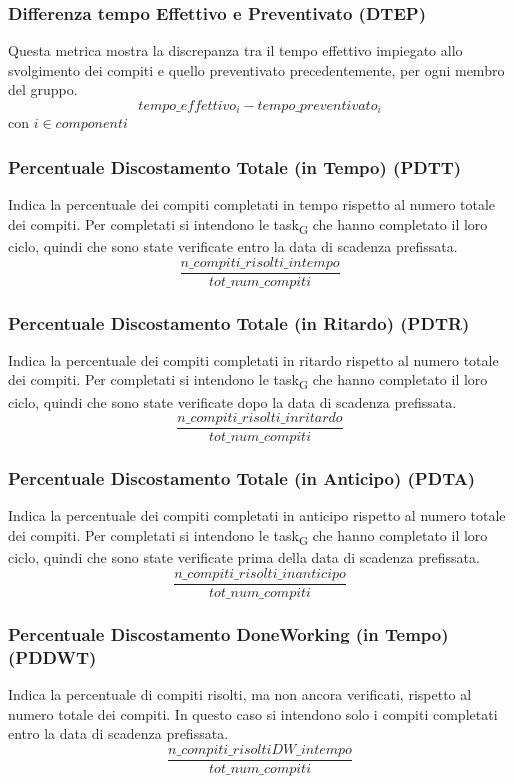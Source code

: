 \subsubsection{Differenza tempo Effettivo e Preventivato (DTEP)}
Questa metrica mostra la discrepanza tra il tempo effettivo impiegato allo svolgimento dei compiti e quello preventivato precedentemente, per ogni membro del gruppo.
\[tempo\_effettivo_i - tempo\_preventivato_i\]
con $i \in {componenti}$
\subsubsection{Percentuale Discostamento Totale (in Tempo) (PDTT)}
Indica la percentuale dei compiti completati in tempo rispetto al numero totale dei compiti. Per completati si intendono le task\textsubscript{G} che hanno completato il loro ciclo, quindi che sono state verificate entro la data di scadenza prefissata.
\[\frac{n\_compiti\_risolti\_intempo}{tot\_num\_compiti}\]
\subsubsection{Percentuale Discostamento Totale (in Ritardo) (PDTR)}
Indica la percentuale dei compiti completati in ritardo rispetto al numero totale dei compiti. Per completati si intendono le task\textsubscript{G} che hanno completato il loro ciclo, quindi che sono state verificate dopo la data di scadenza prefissata.
\[\frac{n\_compiti\_risolti\_inritardo}{tot\_num\_compiti}\]
\subsubsection{Percentuale Discostamento Totale (in Anticipo) (PDTA)}
Indica la percentuale dei compiti completati in anticipo rispetto al numero totale dei compiti. Per completati si intendono le task\textsubscript{G} che hanno completato il loro ciclo, quindi che sono state verificate prima della data di scadenza prefissata.
\[\frac{n\_compiti\_risolti\_inanticipo}{tot\_num\_compiti}\]

\subsubsection{Percentuale Discostamento DoneWorking (in Tempo) (PDDWT)}
Indica la percentuale di compiti risolti, ma non ancora verificati, rispetto al numero totale dei compiti. In questo caso si intendono solo i compiti completati entro la data di scadenza prefissata.
\[\frac{n\_compiti\_risoltiDW\_intempo}{tot\_num\_compiti}\]
